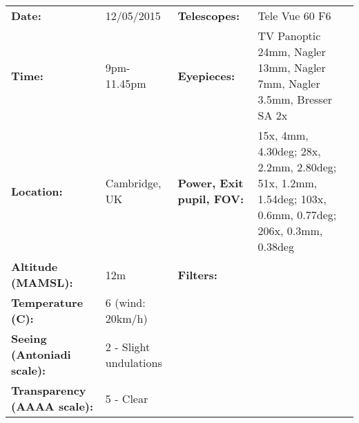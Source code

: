 \begin{tabular}{ p{1.7in} p{1.2in} p{1.5in} p{4.2in}}
{\bf Date:} & 12/05/2015 & {\bf Telescopes:} & Tele Vue 60 F6 \\ 
{\bf Time:} & 9pm-11.45pm & {\bf Eyepieces:} & TV Panoptic 24mm, Nagler 13mm, Nagler 7mm, Nagler 3.5mm, Bresser SA 2x \\ 
{\bf Location:} & Cambridge, UK & {\bf Power, Exit pupil, FOV:} & 15x, 4mm, 4.30deg; 28x, 2.2mm, 2.80deg; 51x, 1.2mm, 1.54deg; 103x, 0.6mm, 0.77deg; 206x, 0.3mm, 0.38deg \\ 
{\bf Altitude (MAMSL):} & 12m & {\bf Filters:} &  \\ 
{\bf Temperature (C):} & 6 (wind: 20km/h) & & \\ 
{\bf Seeing (Antoniadi scale):} & 2 - Slight undulations & & \\ 
{\bf Transparency (AAAA scale):} & 5 - Clear & & \\ 
\end{tabular}
\centering 
